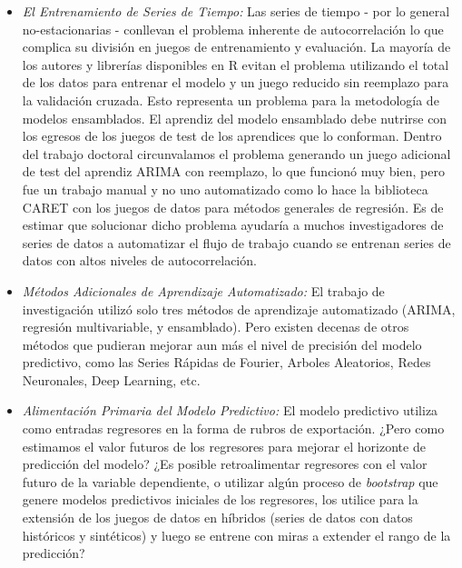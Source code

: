 \begin{itemize}
    \item \emph{El Entrenamiento de Series de Tiempo:} Las series de tiempo - por lo general no-estacionarias - conllevan el problema inherente de autocorrelación lo que complica su división en juegos de entrenamiento y evaluación. La mayoría de los autores y librerías disponibles en R evitan el problema utilizando el total de los datos para entrenar el modelo y un juego reducido sin reemplazo para la validación cruzada. Esto representa un problema para la metodología de modelos ensamblados. El aprendiz del modelo ensamblado debe nutrirse con los egresos de los juegos de test de los aprendices que lo conforman. Dentro del trabajo doctoral circunvalamos el problema generando un juego adicional de test del aprendiz ARIMA con reemplazo, lo que funcionó muy bien, pero fue un trabajo manual y no uno automatizado como lo hace la biblioteca CARET con los juegos de datos para métodos generales de regresión. Es de estimar que solucionar dicho problema ayudaría a muchos investigadores de series de datos a automatizar el flujo de trabajo cuando se entrenan series de datos con altos niveles de autocorrelación. \item \emph{Métodos Adicionales de Aprendizaje Automatizado:} El trabajo de investigación utilizó solo tres métodos de aprendizaje automatizado (ARIMA, regresión multivariable, y ensamblado). Pero existen decenas de otros métodos que pudieran mejorar aun más el nivel de precisión del modelo predictivo, como las Series Rápidas de Fourier, Arboles Aleatorios, Redes Neuronales, Deep Learning, etc.
    \item \emph{Alimentación Primaria del Modelo Predictivo:} El modelo predictivo utiliza como entradas regresores en la forma de rubros de exportación. ¿Pero como estimamos el valor futuros de los regresores para mejorar el horizonte de predicción del modelo? ¿Es posible retroalimentar regresores con el valor futuro de la variable dependiente, o utilizar algún proceso de \emph{bootstrap} que genere modelos predictivos iniciales de los regresores, los utilice para la extensión de los juegos de datos en híbridos (series de datos con datos históricos y sintéticos) y luego se entrene con miras a extender el rango de la predicción?
\end{itemize}
